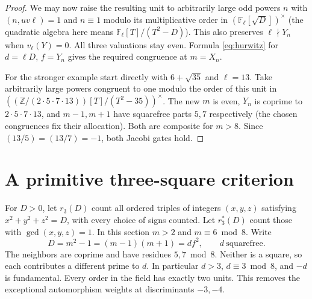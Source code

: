 \documentclass[11pt]{article}
\begin{document}
\begin{proof}
We may now raise the resulting unit to arbitrarily large odd powers
$n$ with $(n,uv\ell)=1$ and $n\equiv1$ modulo its multiplicative
order in $(\mathbb F_\ell[\sqrt D])^\times$ (the quadratic algebra
here means $\mathbb F_\ell[T]/(T^2-D)$). This also preserves
$\ell\nmid Y_n$ when $v_\ell(Y)=0$. All three valuations stay even.
Formula \eqref{eq:hurwitz} for $d=\ell D$, $f=Y_n$ gives the required
congruence at $m=X_n$.

For the stronger example start directly with $6+\sqrt{35}$ and
$\ell=13$. Take arbitrarily large powers congruent to one modulo
the order of this unit in
$((\mathbb Z/(2\cdot5\cdot7\cdot13))[T]/(T^2-35))^\times$.
The new $m$ is even, $Y_n$ is coprime to $2\cdot5\cdot7\cdot13$,
and $m-1,m+1$ have squarefree parts $5,7$ respectively (the chosen
congruences fix their allocation). Both are composite for $m>8$.
Since $(13/5)=(13/7)=-1$, both Jacobi gates hold.
\end{proof}

\section{A primitive three-square criterion}
For $D>0$, let $r_3(D)$ count all ordered triples of integers
$(x,y,z)$ satisfying $x^2+y^2+z^2=D$, with every choice of signs
counted. Let $r_3^*(D)$ count those with $\gcd(x,y,z)=1$. In this
section $m>2$ and $m\equiv6\bmod8$. Write
\[
 D=m^2-1=(m-1)(m+1)=d f^2,\qquad d\ \text{squarefree}.
\]
The neighbors are coprime and have residues $5,7\bmod8$. Neither is
a square, so each contributes a different prime to $d$. In particular
$d>3$, $d\equiv3\bmod8$, and $-d$ is fundamental. Every order in the
field has exactly two units. This removes the exceptional automorphism
weights at discriminants $-3,-4$.
\end{document}
